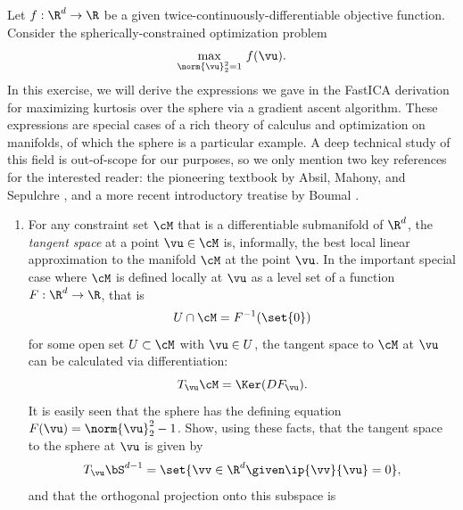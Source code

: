 \documentclass[../../book-main.tex]{subfiles}
\begin{document}
\begin{exercise}\label{exercise:sphere-calculus}
    Let $f : \R^d \to \R$ be a given
    twice-continuously-differentiable objective function. Consider
    the spherically-constrained optimization problem
    \begin{equation}\label{eq:exercise-sphere-constrained-max}
        \max_{\norm{\vu}_2^2 = 1}\, f(\vu).
    \end{equation}
    In this exercise, we will derive the expressions we gave in the
    FastICA derivation for maximizing kurtosis over the sphere via a
    gradient ascent algorithm.
    These expressions are special cases of a rich theory of calculus
    and optimization on manifolds, of which the sphere is a
    particular example. A deep technical study of this field is
    out-of-scope for our purposes, so we only mention two key
    references for the interested reader: the pioneering textbook by
    Absil, Mahony, and Sepulchre
    \cite{Absil2009-nc}, and a more recent introductory treatise by
    Boumal \cite{Boumal2023-rj}.
    \begin{enumerate}
        \item For any constraint set $\cM$ that is a differentiable
            submanifold of $\R^d$, the
            \textit{tangent space} at a point $\vu \in \cM$ is,
            informally, the best local linear approximation to the
            manifold $\cM$ at the point $\vu$.
            In the important special case where $\cM$ is defined
            locally at $\vu$ as a level set of a function $F : \R^d \to \R$,
            that is
            \begin{equation*}
                U \cap \cM = F^{-1}(\set{0})
            \end{equation*}
            for some open set $U \subset \cM$ with $\vu \in U$,
            the tangent space to $\cM$ at $\vu$ can be calculated
            via differentiation:
            \begin{equation*}
                T_{\vu} \cM = \Ker(DF_{\vu}).
            \end{equation*}
            It is easily seen that the sphere has the defining
            equation $F(\vu) = \norm{\vu}_2^2 - 1$.
            Show, using these facts, that the tangent space to the
            sphere at $\vu$ is given by
            \begin{equation*}
                T_{\vu} \bS^{d-1} = \set{\vv \in \R^d \given \ip{\vv}{\vu} = 0},
            \end{equation*}
            and that the orthogonal projection onto this subspace is

\end{enumerate}
\end{exercise}
\end{document}
